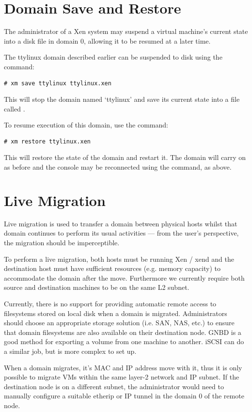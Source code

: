 \documentclass[11pt,twoside,final,openright]{report}
\def\xend{{xend}\xspace}
\begin{document}
\section{Domain Save and Restore}

The administrator of a Xen system may suspend a virtual machine's
current state into a disk file in domain 0, allowing it to be resumed
at a later time.

The ttylinux domain described earlier can be suspended to disk using
the command:
\begin{verbatim}
# xm save ttylinux ttylinux.xen
\end{verbatim}

This will stop the domain named `ttylinux' and save its current state
into a file called .

To resume execution of this domain, use the  command:
\begin{verbatim}
# xm restore ttylinux.xen
\end{verbatim}

This will restore the state of the domain and restart it.  The domain
will carry on as before and the console may be reconnected using the
 command, as above.

\section{Live Migration}

Live migration is used to transfer a domain between physical hosts
whilst that domain continues to perform its usual activities --- from
the user's perspective, the migration should be imperceptible.

To perform a live migration, both hosts must be running Xen / \xend and
the destination host must have sufficient resources (e.g. memory
capacity) to accommodate the domain after the move. Furthermore we
currently require both source and destination machines to be on the 
same L2 subnet. 

Currently, there is no support for providing automatic remote access
to filesystems stored on local disk when a domain is migrated.
Administrators should choose an appropriate storage solution
(i.e. SAN, NAS, etc.) to ensure that domain filesystems are also
available on their destination node. GNBD is a good method for
exporting a volume from one machine to another. iSCSI can do a similar
job, but is more complex to set up.

When a domain migrates, it's MAC and IP address move with it, thus it
is only possible to migrate VMs within the same layer-2 network and IP
subnet. If the destination node is on a different subnet, the
administrator would need to manually configure a suitable etherip or
IP tunnel in the domain 0 of the remote node. 
\end{document}
